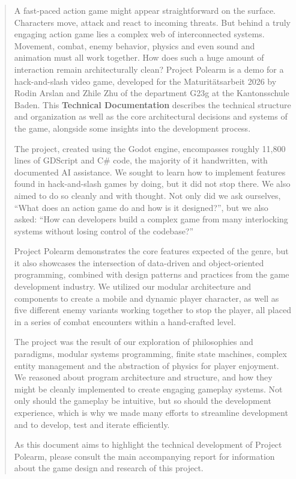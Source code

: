\documentclass[10pt]{article}
\begin{document}
\begin{abstract}
    A fast-paced action game might appear straightforward on the surface. Characters move, attack and react to incoming threats. But behind a truly engaging action game lies a complex web of interconnected systems. Movement, combat, enemy behavior, physics and even sound and animation must all work together. How does such a huge amount of interaction remain architecturally clean? Project Polearm is a demo for a hack-and-slash video game, developed for the Maturitätsarbeit 2026 by Rodin Arslan and Zhile Zhu of the department G23g at the Kantonsschule Baden. This \textbf{Technical Documentation} describes the technical structure and organization as well as the core architectural decisions and systems of the game, alongside some insights into the development process.

    The project, created using the Godot engine, encompasses roughly 11,800 lines of GDScript and C\# code, the majority of it handwritten, with documented AI assistance. We sought to learn how to implement features found in hack-and-slash games by doing, but it did not stop there. We also aimed to do so cleanly and with thought. Not only did we ask ourselves, \enquote{What does an action game do and how is it designed?}, but we also asked: \enquote{How can developers build a complex game from many interlocking systems without losing control of the codebase?}

    Project Polearm demonstrates the core features expected of the genre, but it also showcases the intersection of data-driven and object-oriented programming, combined with design patterns and practices from the game development industry. We utilized our modular architecture and components to create a mobile and dynamic player character, as well as five different enemy variants working together to stop the player, all placed in a series of combat encounters within a hand-crafted level.

    The project was the result of our exploration of philosophies and paradigms, modular systems programming, finite state machines, complex entity management and the abstraction of physics for player enjoyment. We reasoned about program architecture and structure, and how they might be cleanly implemented to create engaging gameplay systems. Not only should the gameplay be intuitive, but so should the development experience, which is why we made many efforts to streamline development and to develop, test and iterate efficiently.

    As this document aims to highlight the technical development of Project Polearm, please consult the main accompanying report for information about the game design and research of this project.


\end{abstract}
\end{document}

